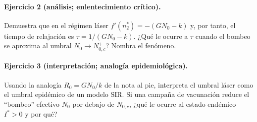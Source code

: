 \paragraph{Ejercicio 2 (análisis; enlentecimiento crítico).} Demuestra que en el régimen láser $f'(n_2^*)=-(GN_0-k)$ y, por tanto, el tiempo de relajación es $\tau=1/(GN_0-k)$. ¿Qué le ocurre a $\tau$ cuando el bombeo se aproxima al umbral $N_0\to N_{0,c}^+$? Nombra el fenómeno.

\paragraph{Ejercicio 3 (interpretación; analogía epidemiológica).} Usando la analogía $R_0=GN_0/k$ de la nota al pie, interpreta el umbral láser como el umbral epidémico de un modelo SIR. Si una campaña de vacunación reduce el ``bombeo'' efectivo $N_0$ por debajo de $N_{0,c}$, ¿qué le ocurre al estado endémico $I^*>0$ y por qué?

